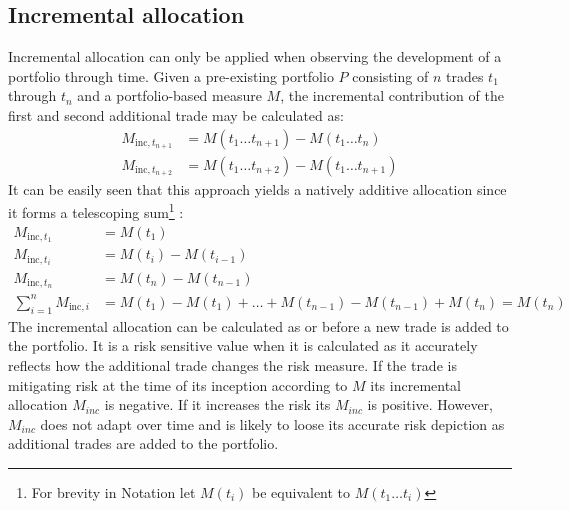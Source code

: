 \documentclass[../Thesis_AHoecherl.tex]{subfiles}
\begin{document}


\subsection{Incremental allocation\label{sec:Incremental alloaction}}
Incremental allocation can only be applied when observing the development of a portfolio through time. Given a pre-existing portfolio $P$ consisting of $n$ trades $t_1$ through $t_n$ and a portfolio-based measure $M$, the incremental contribution of the first and second additional trade may be calculated as:
\begin{align*}
M_{\text{inc},t_{n+1}} & =M\left(t_1\dots t_{n+1}\right)- M\left(t_1\dots t_{n}\right) \\
M_{\text{inc},t_{n+2}} & =M\left(t_1\dots t_{n+2}\right)- M\left(t_1\dots t_{n+1}\right)
\end{align*}
It can be easily seen that this approach yields a natively additive allocation since it forms a telescoping sum\footnote{For brevity in Notation let $M(t_i)$ be equivalent to $M(t_1\dots t_i)$ 
} :
\begin{align*}
M_{\text{inc},t_1}&=M(t_1) \\
M_{\text{inc},t_i}&= M(t_i)-M(t_{i-1}) \\
M_{\text{inc},t_n}&= M(t_n) - M(t_{n-1})\\
\sum_{i=1}^{n}{M_{\text{inc},i}} &= M(t_1)-M(t_1)+\dots+M(t_{n-1})-M(t_{n-1})+M(t_n) = M(t_n)
\end{align*}
The incremental allocation can be calculated as or before a new trade is added to the portfolio. It is a risk sensitive value when it is calculated as it accurately reflects how the additional trade changes the risk measure. 
If the trade is mitigating risk at the time of its inception according to $M$ its incremental allocation $M_{inc}$ is negative. If it increases the risk its $M_{inc}$ is positive. However, $M_{inc}$ does not adapt over time and is likely to loose its accurate risk depiction as additional trades are added to the portfolio. 
\end{document}
